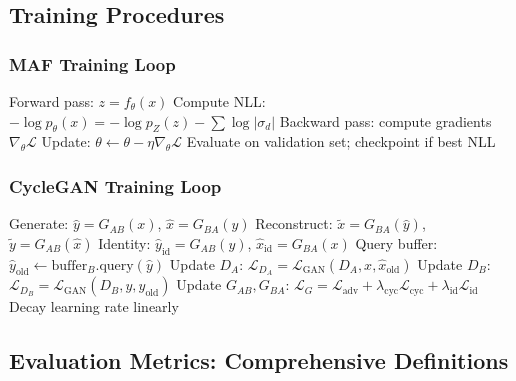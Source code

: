 \documentclass[11pt]{article}
\begin{document}
\subsection{Training Procedures}
\subsubsection{MAF Training Loop}
\begin{algorithm}[H]
\caption{MAF Training}
\begin{algorithmic}
    \STATE Forward pass: $z = f_{\theta}(x)$
    \STATE Compute NLL: $-\log p_{\theta}(x) = -\log p_Z(z) - \sum \log |\sigma_d|$
    \STATE Backward pass: compute gradients $\nabla_{\theta} \mathcal{L}$
    \STATE Update: $\theta \leftarrow \theta - \eta \nabla_{\theta} \mathcal{L}$
  \ENDFOR
  \STATE Evaluate on validation set; checkpoint if best NLL
\ENDFOR
\end{algorithmic}
\end{algorithm}

\subsubsection{CycleGAN Training Loop}
\begin{algorithm}[H]
\caption{CycleGAN Training}
\begin{algorithmic}
    \STATE Generate: $\hat{y} = G_{AB}(x)$, $\hat{x} = G_{BA}(y)$
    \STATE Reconstruct: $\tilde{x} = G_{BA}(\hat{y})$, $\tilde{y} = G_{AB}(\hat{x})$
    \STATE Identity: $\hat{y}_{\text{id}} = G_{AB}(y)$, $\hat{x}_{\text{id}} = G_{BA}(x)$
    \STATE Query buffer: $\hat{y}_{\text{old}} \leftarrow \text{buffer}_B.\text{query}(\hat{y})$
    \STATE Update $D_A$: $\mathcal{L}_{D_A} = \mathcal{L}_{\text{GAN}}(D_A, x, \hat{x}_{\text{old}})$
    \STATE Update $D_B$: $\mathcal{L}_{D_B} = \mathcal{L}_{\text{GAN}}(D_B, y, \hat{y}_{\text{old}})$
    \STATE Update $G_{AB}, G_{BA}$: $\mathcal{L}_G = \mathcal{L}_{\text{adv}} + \lambda_{\text{cyc}} \mathcal{L}_{\text{cyc}} + \lambda_{\text{id}} \mathcal{L}_{\text{id}}$
  \ENDFOR
    \STATE Decay learning rate linearly
  \ENDIF
\ENDFOR
\end{algorithmic}
\end{algorithm}

\subsection{Evaluation Metrics: Comprehensive Definitions}
\end{document}
